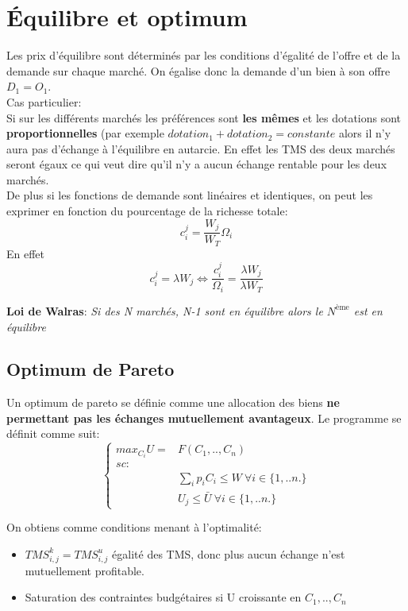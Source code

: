 \section{Équilibre et optimum}

Les prix d'équilibre sont déterminés par les conditions d'égalité de l'offre et de la demande sur chaque marché. On égalise donc la demande d'un bien à son offre $D_1=O_1$.\\
Cas particulier:\\

Si sur les différents marchés les préférences sont \textbf{les mêmes} et les dotations sont \textbf{proportionnelles} (par exemple $dotation_1 +dotation_2=constante$ alors il n'y aura pas d'échange à l'équilibre en autarcie. En effet les TMS des deux marchés seront égaux ce qui veut dire qu'il n'y a aucun échange rentable pour les deux marchés.\\

De plus si les fonctions de demande sont linéaires et identiques, on peut les exprimer en fonction du pourcentage de la richesse totale:
$$
c_i^j=\frac{W_j}{W_T}\Omega_i
$$
En effet 
$$
c_i^j= \lambda W_j \Leftrightarrow \frac{c_i^j}{\Omega_i}=\frac{\lambda W_j}{\lambda W_T}
$$



\textbf{Loi de Walras}: \textit{Si des N marchés, N-1 sont en équilibre alors le $N^{\text{ème}}$ est en équilibre}

\subsection{Optimum de Pareto}

Un optimum de pareto se définie comme une allocation des biens \textbf{ne permettant pas les échanges mutuellement avantageux}. Le programme se définit comme suit:
$$
\left\{
\begin{array}{cc}
 max_{C_i}U= & F(C_1,..,C_n)  \\
 sc: & \\
 & \sum_i p_i C_i \leq W \ \forall i \in \{ 1,..n .\}\\
 & U_j \leq \bar{U} \ \forall i \in \{ 1,..n .\}
\end{array} 
\right.
$$

On obtiens comme conditions menant à l'optimalité:
\begin{itemize}
\item $TMS_{i,j}^{k}=TMS_{i,j}^{u}$ égalité des TMS, donc plus aucun échange n'est mutuellement profitable.
\item Saturation des contraintes budgétaires si U croissante en $C_1,..,C_n$
\end{itemize}


